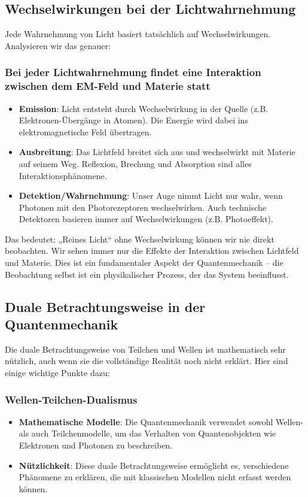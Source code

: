 \documentclass[12pt,a4paper]{article}
\begin{document}
	\subsection{Wechselwirkungen bei der Lichtwahrnehmung}
	
	Jede Wahrnehmung von Licht basiert tatsächlich auf Wechselwirkungen. Analysieren wir das genauer:
	
	\subsubsection{Bei jeder Lichtwahrnehmung findet eine Interaktion zwischen dem EM-Feld und Materie statt}
	\begin{itemize}
		\item \textbf{Emission}: Licht entsteht durch Wechselwirkung in der Quelle (z.B. Elektronen-Übergänge in Atomen). Die Energie wird dabei ins elektromagnetische Feld übertragen.
		\item \textbf{Ausbreitung}: Das Lichtfeld breitet sich aus und wechselwirkt mit Materie auf seinem Weg. Reflexion, Brechung und Absorption sind alles Interaktionsphänomene.
		\item \textbf{Detektion/Wahrnehmung}: Unser Auge nimmt Licht nur wahr, wenn Photonen mit den Photorezeptoren wechselwirken. Auch technische Detektoren basieren immer auf Wechselwirkungen (z.B. Photoeffekt).
	\end{itemize}
	
	Das bedeutet: „Reines Licht“ ohne Wechselwirkung können wir nie direkt beobachten. Wir sehen immer nur die Effekte der Interaktion zwischen Lichtfeld und Materie. Dies ist ein fundamentaler Aspekt der Quantenmechanik – die Beobachtung selbst ist ein physikalischer Prozess, der das System beeinflusst.
	
	\subsection{Duale Betrachtungsweise in der Quantenmechanik}
	
	Die duale Betrachtungsweise von Teilchen und Wellen ist mathematisch sehr nützlich, auch wenn sie die vollständige Realität noch nicht erklärt. Hier sind einige wichtige Punkte dazu:
	
	\subsubsection{Wellen-Teilchen-Dualismus}
	\begin{itemize}
		\item \textbf{Mathematische Modelle}: Die Quantenmechanik verwendet sowohl Wellen- als auch Teilchenmodelle, um das Verhalten von Quantenobjekten wie Elektronen und Photonen zu beschreiben.
		\item \textbf{Nützlichkeit}: Diese duale Betrachtungsweise ermöglicht es, verschiedene Phänomene zu erklären, die mit klassischen Modellen nicht erfasst werden können.
	\end{itemize}
	
\end{document}
